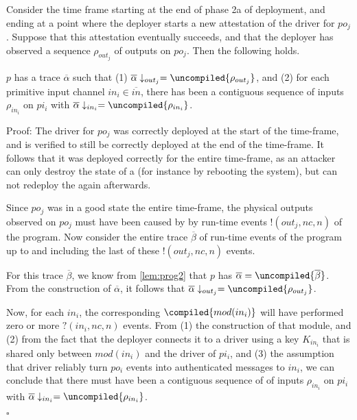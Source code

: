 Consider the time frame starting at the end of phase 2a of deployment, and
ending at a point where the deployer starts a new attestation of the driver
\protmod{} 
for $po_j$. Suppose that  this attestation eventually succeeds, and that the deployer has observed a sequence $\rho_{out_j}$ of outputs on $po_j$. Then the following holds.
% 
\begin{theorem}
$p$ has a trace $\overline{\alpha}$ such that (1) $\overline{\alpha}\downarrow_{out_j} = \uncompiled{\rho_{out_j}}$,
and (2) for each primitive input channel $in_i \in \overline{in}$, there has been a contiguous sequence of inputs $\rho_{in_i}$ on $pi_i$ with  $\overline{\alpha}\downarrow_{in_i} = \uncompiled{\rho_{in_i}}$.
\end{theorem}
Proof:
The driver \protmod{} for $po_j$ was correctly deployed at the start of the time-frame, and is verified to still be correctly deployed at the end of the time-frame.
It follows that it was deployed correctly for the entire time-frame, as an
attacker can only destroy the state of a \protmod{} (for instance by rebooting the system),
but can not redeploy the \protmod{} again afterwards.

Since $po_j$ was in a good state the entire time-frame, the physical outputs observed on $po_j$ must have been caused by by run-time events $!(out_j,nc,n)$ of the program.
Now consider the entire trace $\overline{\beta}$ of run-time events of the program up to and including the last of these $!(out_j,nc,n)$ events.

For this trace $\overline{\beta}$, we know from \cref{lem:prog2} that $p$ has $\overline{\alpha} = \uncompiled{\overline{\beta}}$. 
From the construction of $\overline{\alpha}$, it follows that $\overline{\alpha}\downarrow_{out_j} = \uncompiled{\rho_{out_j}}$.

Now, for each $in_i$, the corresponding \protmod{} $\compiled{mod(in_i)}$ will have performed zero or more $?(in_i,nc,n)$ events. From (1) the construction of that module,
and (2) from the fact that the deployer connects it to a driver \protmod{}
using a key $K_{in_i}$ that is shared only between $mod(in_i)$ and the
driver \protmod{} 
of $pi_i$, and (3) the assumption that driver \protmods{} reliably turn $po_i$ events into authenticated messages to $in_i$, we can conclude that there must have been
a contiguous sequence of  of inputs $\rho_{in_i}$ on $pi_i$  with  $\overline{\alpha}\downarrow_{in_i} = \uncompiled{\rho_{in_i}}$.

\hfill $\square$

